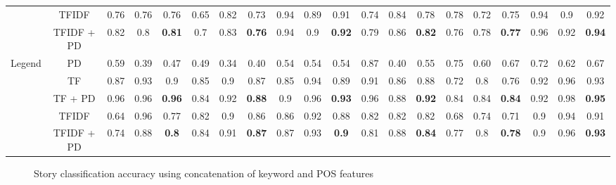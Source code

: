 \documentclass[times, 11pt, a4paper]{article}
\begin{document}
\begin{table}[!htbp]
{\begin{tabular}{|c|c|c|c|c|c|c|c|c|c|c||c|c|c|c|c|c|c|c|c|}
 & TFIDF & 0.76 & 0.76 & 0.76 & 0.65 & 0.82 & 0.73 & 0.94 & 0.89 & 0.91 & 0.74 & 0.84 & 0.78 & 0.78 & 0.72 & 0.75 & 0.94 & 0.9 & 0.92 \\ \cline{2-20} 
 & TFIDF + PD & 0.82 & 0.8 & \textbf{0.81} & 0.7 & 0.83 & \textbf{0.76} & 0.94 & 0.9 & \textbf{0.92} & 0.79 & 0.86 & \textbf{0.82} & 0.76 & 0.78 & \textbf{0.77} & 0.96 & 0.92 & \textbf{0.94} \\ \hline
\multirow{5}{*}{Legend} & PD & 0.59 & 0.39 & 0.47 & 0.49 & 0.34 & 0.40 & 0.54 & 0.54 & 0.54 & 0.87 & 0.40 & 0.55 & 0.75 & 0.60 & 0.67 & 0.72 & 0.62 & 0.67 \\ \cline{2-20} 
 & TF & 0.87 & 0.93 & 0.9 & 0.85 & 0.9 & 0.87 & 0.85 & 0.94 & 0.89 & 0.91 & 0.86 & 0.88 & 0.72 & 0.8 & 0.76 & 0.92 & 0.96 & 0.93 \\ \cline{2-20} 
 & TF + PD & 0.96 & 0.96 & \textbf{0.96} & 0.84 & 0.92 & \textbf{0.88} & 0.9 & 0.96 & \textbf{0.93} & 0.96 & 0.88 & \textbf{0.92} & 0.84 & 0.84 & \textbf{0.84} & 0.92 & 0.98 & \textbf{0.95} \\ \cline{2-20} 
 & TFIDF & 0.64 & 0.96 & 0.77 & 0.82 & 0.9 & 0.86 & 0.86 & 0.92 & 0.88 & 0.82 & 0.82 & 0.82 & 0.68 & 0.74 & 0.71 & 0.9 & 0.94 & 0.91 \\ \cline{2-20} 
 & TFIDF + PD & 0.74 & 0.88 & \textbf{0.8} & 0.84 & 0.91 & \textbf{0.87} & 0.87 & 0.93 & \textbf{0.9} & 0.81 & 0.88 & \textbf{0.84} & 0.77 & 0.8 & \textbf{0.78} & 0.9 & 0.96 & \textbf{0.93} \\ \hline
 \end{tabular}}
\end{table}


\begin{figure}[!htbp] 
\centering
\centering
\caption{Story classification accuracy using concatenation of keyword and POS features}
\label{Figure: Story Accuracy set 2}
\end{figure}	
\end{document}
